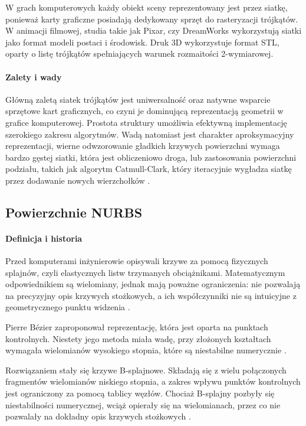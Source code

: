 W grach komputerowych każdy obiekt sceny reprezentowany jest przez siatkę, ponieważ karty graficzne posiadają dedykowany sprzęt do rasteryzacji trójkątów. W animacji filmowej, studia takie jak Pixar, czy DreamWorks wykorzystują siatki jako format modeli postaci i środowisk. Druk 3D wykorzystuje format STL, oparty o listę trójkątów spełniających warunek rozmaitości 2-wymiarowej.

\paragraph{Zalety i wady}
Główną zaletą siatek trójkątów jest uniwersalność oraz natywne wsparcie sprzętowe kart graficznych, co czyni je dominującą reprezentacją geometrii w grafice komputerowej. Prostota struktury umożliwia efektywną implementację szerokiego zakresu algorytmów. Wadą natomiast jest charakter aproksymacyjny reprezentacji, wierne odwzorowanie gładkich krzywych powierzchni wymaga bardzo gęstej siatki, która jest obliczeniowo droga, lub zastosowania powierzchni podziału, takich jak algorytm Catmull-Clark, który iteracyjnie wygładza siatkę przez dodawanie nowych wierzchołków \cite{halstead1993}.

\subsection{Powierzchnie NURBS}
\label{sec:nurbs}

\paragraph{Definicja i historia}
Przed komputerami inżynierowie opisywali krzywe za pomocą fizycznych splajnów, czyli elastycznych listw trzymanych obciążnikami. Matematycznym odpowiednikiem są wielomiany, jednak mają poważne ograniczenia: nie pozwalają na precyzyjny opis krzywych stożkowych, a ich współczynniki nie są intuicyjne z geometrycznego punktu widzenia \cite{rogers2001}.

Pierre Bézier zaproponował reprezentację, która jest oparta na punktach kontrolnych. Niestety jego metoda miała wadę, przy złożonych kształtach wymagała wielomianów wysokiego stopnia, które są niestabilne numerycznie \cite{rogers2001}.

Rozwiązaniem stały się krzywe B-splajnowe. Składają się z wielu połączonych fragmentów wielomianów niskiego stopnia, a zakres wpływu punktów kontrolnych jest ograniczony za pomocą tablicy węzłów. Chociaż B-splajny pozbyły się niestabilności numerycznej, wciąż opierały się na wielomianach, przez co nie pozwalały na dokładny opis krzywych stożkowych \cite{rogers2001, piegl1997}.

